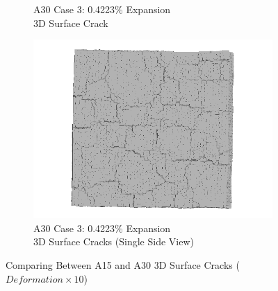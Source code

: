 \begin{figure}[ht!]
\begin{subfigure}{.5\textwidth}
    \caption{A30 Case 3: 0.4223\% Expansion\\ 3D Surface Crack}
    \end{subfigure}%
    \begin{subfigure}{.5\textwidth}
      \centering
      \includegraphics[width=.8\linewidth]{Files/exp_3D/ASR/A30P75_3_3ds.png}
    \caption{A30 Case 3: 0.4223\% Expansion\\ 3D Surface Cracks (Single Side View)}
    \end{subfigure}

  \caption{Comparing Between A15 and A30 3D Surface Cracks ($Deformation \times 10$)}
  \label{fig:ASR_A15vsA30P75_3Dfffs}
\end{figure}

